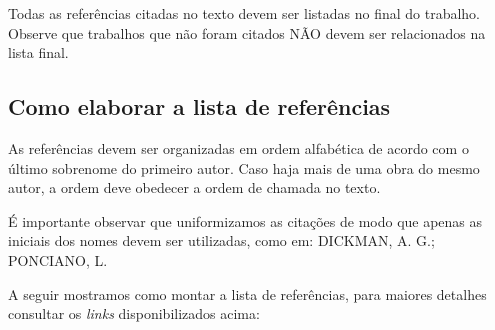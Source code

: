 \documentclass[a4paper,12pt]{article}
\begin{document}
	Todas as referências citadas no texto devem ser listadas no final do trabalho. Observe que trabalhos que não foram citados NÃO devem ser relacionados na lista final.
	
	\subsection{Como elaborar a lista de referências}
	
	As referências devem ser organizadas em ordem alfabética de acordo com o último sobrenome do primeiro autor. Caso haja mais de uma obra do mesmo autor, a ordem deve obedecer a ordem de chamada no texto.
	
	É importante observar que uniformizamos as citações de modo que apenas as iniciais dos nomes devem ser utilizadas, como em: DICKMAN, A. G.; PONCIANO, L. 
	
	A seguir mostramos como montar a lista de referências, para maiores detalhes consultar os {\it links} disponibilizados acima:
	
\end{document}
